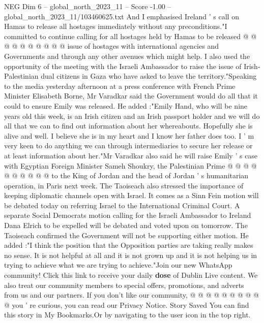 \begin{textsample}{NEG Dim 6 – global\_north\_2023\_11 – Score -1.00 – global\_north\_2023\_11/103460625.txt}
And I emphasised Ireland ' s call on Hamas to release all hostages immediately without any preconditions."I committed to continue calling for all hostages held by Hamas to be released @ @ @ @ @ @ @ @ @ @ issue of hostages with international agencies and Governments and through any other avenues which might help.
I also used the opportunity of the meeting with the Israeli Ambassador to raise the issue of Irish-Palestinian dual citizens in Gaza who have asked to leave the territory."Speaking to the media yesterday afternoon at a press conference with French Prime Minister Elisabeth Borne, Mr Varadkar said the Government would do all that it could to ensure Emily was released.
He added :"Emily Hand, who will be nine years old this week, is an Irish citizen and an Irish passport holder and we will do all that we can to find out information about her whereabouts.
Hopefully she is alive and well.
I believe she is in my heart and I know her father does too.
I ' m very keen to do anything we can through intermediaries to secure her release or at least information about her."Mr Varadkar also said he will raise Emily ' s case with Egyptian Foreign Minister Sameh Shoukry, the Palestinian Prime @ @ @ @ @ @ @ @ @ @ to the King of Jordan and the head of Jordan ' s humanitarian operation, in Paris next week.
The Taoiseach also stressed the importance of keeping diplomatic channels open with Israel.
It comes as a Sinn Fein motion will be debated today on referring Israel to the International Criminal Court.
A separate Social Democrats motion calling for the Israeli Ambassador to Ireland Dana Elrich to be expelled will be debated and voted upon on tomorrow.
The Taoiseach confirmed the Government will not be supporting either motion.
He added :"I think the position that the Opposition parties are taking really makes no sense.
It is not helpful at all and it is not grown up and it is not helping us in trying to achieve what we are trying to achieve."Join our new WhatsApp community!
Click this link to receive your daily \textbf{dose} of Dublin Live content.
We also treat our community members to special offers, promotions, and adverts from us and our partners.
If you don't like our community, @ @ @ @ @ @ @ @ @ @ you ' re curious, you can read our Privacy Notice.
Story Saved You can find this story in My Bookmarks.Or by navigating to the user icon in the top right.

\end{textsample}
